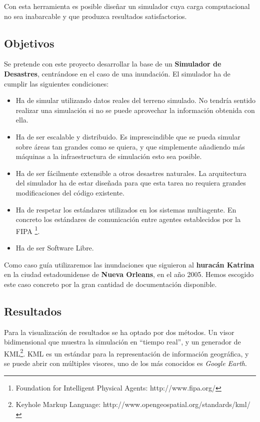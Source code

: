 Con esta herramienta es posible diseñar un simulador cuya carga computacional
no sea inabarcable y que produzca resultados satisfactorios.

\subsection*{Objetivos}

Se pretende con este proyecto desarrollar la base de un {\bf Simulador de
Desastres}, centrándose en el caso de una inundación. El simulador ha de cumplir
las siguientes condiciones:

\begin{itemize}
 \item Ha de simular utilizando datos reales del terreno simulado. No tendría
sentido realizar una simulación si no se puede aprovechar la información
obtenida con ella.
 \item Ha de ser escalable y distribuido. Es imprescindible que se pueda
simular sobre áreas tan grandes como se quiera, y que simplemente añadiendo más
máquinas a la infraestructura de simulación esto sea posible.
 \item Ha de ser fácilmente extensible a otros desastres naturales. La
arquitectura del simulador ha de estar diseñada para que esta tarea no requiera
grandes modificaciones del código existente.
 \item Ha de respetar los estándares utilizados en los sistemas multiagente. En
concreto los estándares de comunicación entre agentes establecidos por la FIPA
\footnote{Foundation for Intelligent Physical Agents: http://www.fipa.org/}.
 \item Ha de ser Software Libre. %
\end{itemize}

Como caso guía utilizaremos las inundaciones que siguieron al {\bf huracán
Katrina} en la ciudad estadounidense de {\bf Nueva Orleans}, en el año 2005.
Hemos escogido este caso concreto por la gran cantidad de documentación
disponible.

\subsection*{Resultados}

Para la visualización de resultados se ha optado por dos métodos. Un visor
bidimensional que muestra la simulación en ``tiempo real'', y un generador de
KML\footnote{Keyhole Markup Language:
http://www.opengeospatial.org/standards/kml/}. KML es un estándar para la
representación de información geográfica, y se puede abrir con múltiples
visores, uno de los más conocidos es {\em Google Earth}.

